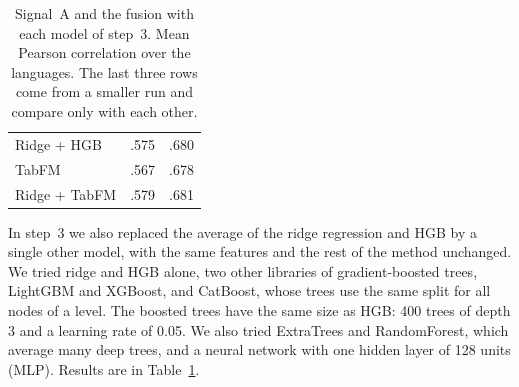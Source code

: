 \begin{table}[t]
\begin{tabular}{lcc}
Ridge + HGB         & .575 & .680 \\ %
TabFM                & .567 & .678 \\ %
Ridge + TabFM        & .579 & .681 \\ %
\bottomrule
\end{tabular}
\caption{Signal~A and the fusion with each model of step~3. Mean Pearson correlation over the
languages. The last three rows come from a smaller run and compare only with each other.}
\label{tab:signal-a-models}
\end{table}

In step~3 we also replaced the average of the ridge regression and HGB by a single other model, %
with the same features and the rest of the method unchanged. We tried ridge and HGB alone, two
other libraries of gradient-boosted trees, LightGBM and XGBoost, and CatBoost, whose trees use the
same split for all nodes of a level. The boosted trees have the same size as HGB: 400 trees of %
depth 3 and a learning rate of 0.05. We also tried ExtraTrees and RandomForest, which average many %
deep trees, and a neural network with one hidden layer of 128 units (MLP). %
Results are in Table~\ref{tab:signal-a-models}.

